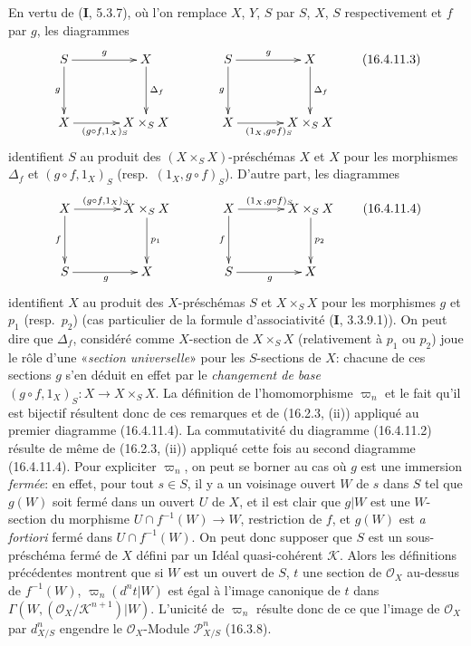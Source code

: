 En vertu de (\textbf{I}, 5.3.7), où l'on remplace $X$, $Y$, $S$ par $S$, $X$, $S$
respectivement et $f$ par $g$, les diagrammes
\[
  \xymatrix@=3pc{
    S\ar[r]^-g\ar[d]_-g&X\ar[d]^-{\Delta_f}
      &S\ar[r]^-g\ar[d]_-g&X\ar[d]^-{\Delta_f}\\
    X\ar[r]_{(g\circ f,1_X)_S}&X\times_S X
      &X\ar[r]_{(1_X,g\circ f)_S}&X\times_S X
  }
  \tag{16.4.11.3}
  \label{IV.16.4.11.3}
\]
identifient $S$ au produit des $(X\times_S X)$-préschémas $X$ et $X$ pour les
morphismes $\Delta_f$ et $(g\circ f,1_X)_S$ (resp.\ $(1_X,g\circ f)_S$).
D'autre part, les diagrammes
\[
  \xymatrix@=3pc{
    X\ar[r]^{(g\circ f,1_X)_S}\ar[d]_-f&X\times_S X\ar[d]^-{p_1}
      &X\ar[r]^{(1_X,g\circ f)_S}\ar[d]_-f&X\times_S X\ar[d]^-{p_2}\\
    S\ar[r]_{g}&X&S\ar[r]_{g}&X
  }
  \tag{16.4.11.4}
  \label{IV.16.4.11.4}
\]
identifient $X$ au produit des $X$-préschémas $S$ et $X\times_S X$ pour les
morphismes $g$ et $p_1$ (resp.\ $p_2$) (cas particulier de la formule
d'associativité (\textbf{I}, 3.3.9.1)). On peut dire que $\Delta_f$, considéré comme
$X$-section de $X\times_S X$ (relativement à $p_1$ ou $p_2$) joue le rôle
d'une «\emph{section universelle}» pour les $S$-sections de $X$: chacune de ces
sections $g$ s'en déduit en effet par le \emph{changement de base}
$(g\circ f,1_X)_S:X\to X\times_S X$. La définition de l'homomorphisme
$\varpi_n$ et le fait qu'il est bijectif résultent donc de ces remarques et de
(16.2.3, (ii)) appliqué au premier diagramme (16.4.11.4). La commutativité du
diagramme (16.4.11.2) résulte de même de (16.2.3, (ii)) appliqué cette fois au
second diagramme (16.4.11.4). Pour expliciter $\varpi_n$, on peut se borner au
cas où $g$ est une immersion \emph{fermée}: en effet, pour tout $s\in S$, il y
a un voisinage ouvert $W$ de $s$ dans $S$ tel que $g(W)$ soit fermé dans un
ouvert $U$ de $X$, et il est clair que $g|W$ est une $W$-section du morphisme
$U\cap f^{-1}(W)\to W$, restriction de $f$, et $g(W)$ est \emph{a fortiori}
fermé dans $U\cap f^{-1}(W)$. On peut donc supposer que $S$ est un
sous-préschéma fermé de $X$ défini par un Idéal quasi-cohérent $\mathscr{K}$.
Alors les définitions précédentes montrent que si $W$ est un ouvert de $S$,
$t$ une section de $\mathcal{O}_X$ au-dessus de $f^{-1}(W)$,
$\varpi_n(d^n t|W)$ est égal à l'image canonique de $t$ dans
$\Gamma(W,(\mathcal{O}_X/\mathscr{K}^{n+1})|W)$. L'unicité de $\varpi_n$
résulte donc de ce que l'image de $\mathcal{O}_X$ par $d_{X/S}^n$ engendre le
$\mathcal{O}_X$-Module $\mathscr{P}_{X/S}^n$ (16.3.8).

